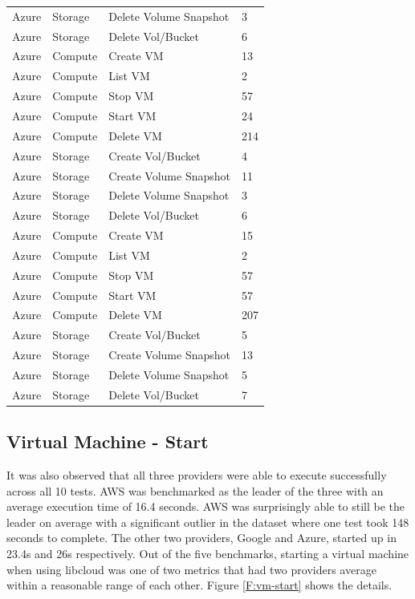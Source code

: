 \begin{table}[htb]
\begin{tabular} {p{3cm}|p{3cm}|p{5cm}|p{3cm}}
Azure & Storage & Delete Volume Snapshot & 3  \\
Azure & Storage & Delete Vol/Bucket & 6  \\
Azure & Compute & Create VM & 13  \\
Azure & Compute & List VM & 2  \\
Azure & Compute & Stop VM & 57  \\
Azure & Compute & Start VM & 24  \\
Azure & Compute & Delete VM & 214  \\
Azure & Storage & Create Vol/Bucket & 4  \\
Azure & Storage & Create Volume Snapshot & 11  \\
Azure & Storage & Delete Volume Snapshot & 3  \\
Azure & Storage & Delete Vol/Bucket & 6  \\
Azure & Compute & Create VM & 15  \\
Azure & Compute & List VM & 2  \\
Azure & Compute & Stop VM & 57  \\
Azure & Compute & Start VM & 57  \\
Azure & Compute & Delete VM & 207  \\
Azure & Storage & Create Vol/Bucket & 5  \\
Azure & Storage & Create Volume Snapshot & 13  \\
Azure & Storage & Delete Volume Snapshot & 5  \\
Azure & Storage & Delete Vol/Bucket & 7  \\
\end{tabular}
\end{table}



\subsection{Virtual Machine - Start}

It was also observed that all three providers were able to execute successfully
across all 10 tests. AWS was benchmarked as the leader of the three with an
average execution time of 16.4 seconds. AWS was surprisingly able to still be
the leader on average with a significant outlier in the dataset where one test
took 148 seconds to complete. The other two providers, Google and
Azure, started up in 23.4s and 26s respectively. Out of the five benchmarks,
starting a virtual machine when using libcloud was one of two metrics that had
two providers average within a reasonable range of each other. Figure \ref{F:vm-start}
shows the details.

